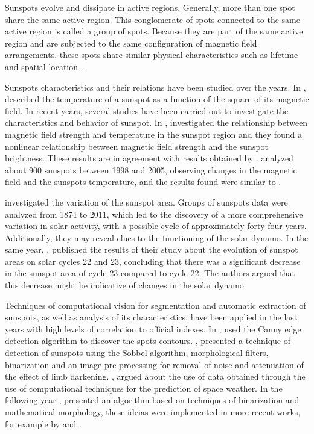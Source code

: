 \documentclass[namedreferences]{solarphysics}
\begin{document}
\begin{article}
Sunspots evolve and dissipate in active regions.
Generally, more than one spot share the same active region.
This conglomerate of spots connected to the same active region is called a group of spots.
Because they are part of the same active region and are subjected to the same configuration of magnetic field arrangements,
these spots share similar physical characteristics such as lifetime and spatial location \citep{curto2008}.

Sunspots characteristics and their relations have been studied over the years.
In \citeyear{Dicke1970}, \citeauthor{Dicke1970} described the temperature of a sunspot as a function of the square of its magnetic field.
In recent years, several studies have been carried out to investigate the characteristics and behavior of sunspot.
In \citeyear{Kopp1992}, \citeauthor{Kopp1992} investigated the relationship between magnetic field strength and temperature in the sunspot region and they found a nonlinear relationship between magnetic field strength and the sunspot brightness.
These results are in agreement with results obtained by \citealp{Dicke1970}.
\citealp{Penn2006} analyzed about 900 sunspots between 1998 and 2005,
observing changes in the magnetic field and the sunspots temperature,
and the results found were similar to \citealp{Kopp1992}.

\citealp{Javaraiah2013} investigated the variation of the sunspot area.
Groups of sunspots data were analyzed from 1874 to 2011,
which led to the discovery of a more comprehensive variation in solar activity, 
with a possible cycle of approximately forty-four years.
Additionally, they may reveal clues to the functioning of the solar dynamo. 
In the same year, \citealp{Toma2013}, published the results of their study about the evolution of sunspot areas on solar cycles 22 and 23,
concluding that there was a significant decrease in the sunspot area of cycle 23 compared to cycle 22.
The authors argued that this decrease might be indicative of changes in the solar dynamo.

Techniques of computational vision for segmentation and automatic extraction of sunspots,
as well as analysis of its characteristics,
have been applied in the last years with high levels of correlation to official indexes.
In \citeyear{zharkova2003}, \citeauthor{zharkova2003} used the Canny edge detection algorithm to discover the spots contours.
\citealp{zharkov2005}, presented a technique of detection of sunspots using the Sobbel algorithm,
morphological filters, binarization and an image pre-processing for removal of noise and attenuation of the effect of limb darkening.
\citealp{colak2007}, argued about the use of data obtained through the use of computational techniques for the prediction of space weather.
In the following year \citealp{curto2008}, presented an algorithm based on techniques of binarization and mathematical morphology,
these ideias were implemented in more recent works, for example by \citealp{spagiari2012} and \citealp{curto2008}.


\end{article}
\end{document}
